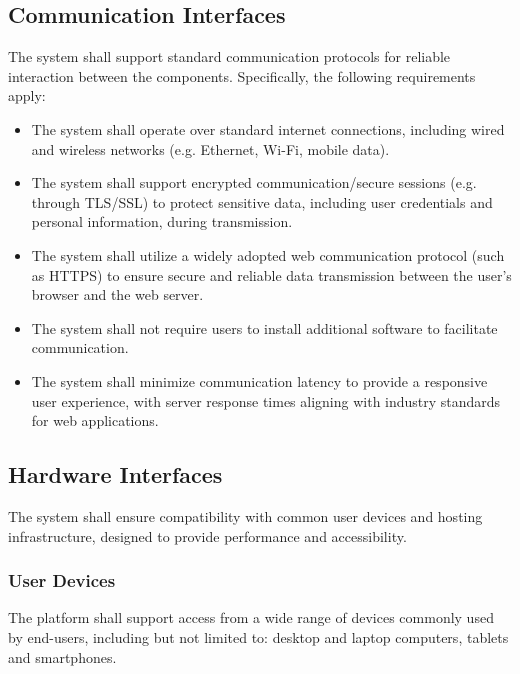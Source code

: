 \subsection{Communication Interfaces}
\label{subsec:communication_interfaces}

The system shall support standard communication protocols for reliable interaction between the components. Specifically, the following requirements apply:

\begin{itemize}
    \item The system shall operate over standard internet connections, including wired and wireless networks (e.g. Ethernet, Wi-Fi, mobile data).

    \item The system shall support encrypted communication/secure sessions (e.g. through TLS/SSL) to protect sensitive data, including user credentials and personal information, during transmission.

    \item The system shall utilize a widely adopted web communication protocol (such as HTTPS) to ensure secure and reliable data transmission between the user's browser and the web server.

    \item The system shall not require users to install additional software to facilitate communication.

    \item The system shall minimize communication latency to provide a responsive user experience, with server response times aligning with industry standards for web applications.
\end{itemize}

\subsection{Hardware Interfaces}
\label{subsec:hardware_interfaces}

The system shall ensure compatibility with common user devices and hosting infrastructure, designed to provide performance and accessibility.

\subsubsection{User Devices}

The platform shall support access from a wide range of devices commonly used by end-users, including but not limited to: desktop and laptop computers, tablets and smartphones.

